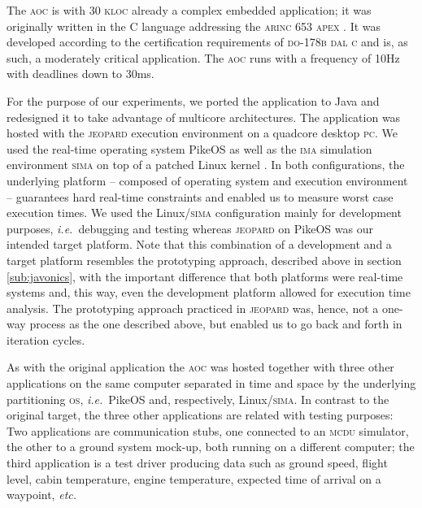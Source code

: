 \documentclass{sig-alternate}
\newcommand{\acronym}[1]{\textsc{#1}}
\newcommand{\ie}{\textit{i.e.}}
\newcommand{\etc}{\textit{etc.}}
\begin{document}
The \acronym{aoc} is with 30 \acronym{kloc} 
already a complex embedded application;
it was originally written in the C language
addressing the \acronym{arinc 653} \acronym{apex} \cite{A653P1}.
It was developed according to the certification requirements
of \acronym{do-178b} \acronym{dal c} \cite{do178} and is, as such, 
a moderately critical application.
The \acronym{aoc} runs with a frequency
of 10Hz with deadlines down to 30ms. 

For the purpose of our experiments,
we ported the application to Java
and redesigned it to take advantage of multicore architectures.
The application was hosted 
with the \acronym{jeopard} execution environment
on a quadcore desktop \acronym{pc}.
We used the real-time operating system PikeOS
as well as the \acronym{ima} simulation environment
\acronym{sima} \cite{sima09} 
on top of a patched Linux kernel \cite{ros:07}.
In both configurations, the underlying platform --
composed of operating system and execution environment --
guarantees hard real-time constraints and enabled us to
measure worst case execution times.
We used the Linux/\acronym{sima} configuration mainly
for development purposes, \ie\ debugging and testing 
whereas \acronym{jeopard} on PikeOS was our intended
target platform.
Note that this combination of a development and a target
platform resembles the prototyping approach, described above
in section \ref{sub:javonics}, with the important difference
that both platforms were real-time systems and, this way,
even the development platform 
allowed for execution time analysis.
The prototyping approach practiced in \acronym{jeopard}
was, hence, not a one-way process as the one described above,
but enabled us to go back and forth in  iteration cycles.

As with the original application
the \acronym{aoc} was hosted together 
with three other applications on the same computer
separated in time and space 
by the underlying partitioning \acronym{os}, 
\ie\ PikeOS and, respectively, Linux/\acronym{sima}.
In contrast to the original target,
the three other applications are related 
with testing purposes: 
Two applications are communication stubs,
one connected to an \acronym{mcdu} simulator,
the other to a ground system mock-up,
both running on a different computer;
the third application is a test driver
producing data such as ground speed, flight level,
cabin temperature, engine temperature, 
expected time of arrival on a waypoint, \etc

\end{document}
